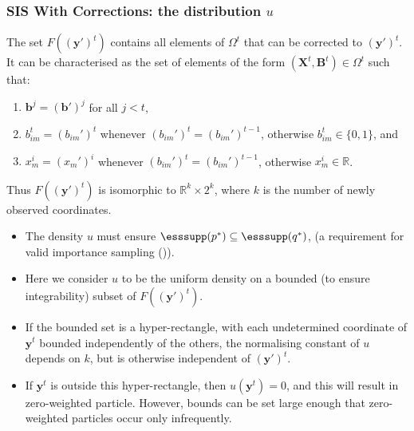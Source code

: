 \documentclass[9pt, xcolor={dvipsnames,svgnames,table}]{beamer}
\newcommand{\Real}{\mathbb R}
\begin{document}
\begin{frame}
    \frametitle{SIS With Corrections: the distribution $u$}
    The set $F(\bm{(y')}^{t})$ contains all elements of $\Omega^t$ that can be corrected to $\bm{(y')}^{t}$. It can be characterised as the set of elements of the form $(\bm{X}^{t},\bm{B}^{t}) \in \Omega^t$ such that:
    \begin{enumerate}
        \item $\bm{b}^{j} = (\bm{b}')^{j}$ for all $j < t$,
        \item $b_{im}^{t} = (b_{im}')^t$ whenever $(b_{im}')^t = (b_{im}')^{t-1}$, otherwise $b_{im}^{t} \in \{ 0, 1 \}$, and
        \item $x_{m}^{i} = (x_{m}')^{i}$ whenever $(b_{im}')^t = (b_{im}')^{t-1}$, otherwise $x_{m}^{i} \in \Real$.
    \end{enumerate}
    Thus $F(\bm{(y')}^{t})$ is isomorphic to $\Real^k \times 2^k$, where $k$ is the number of newly observed coordinates.
    
    \begin{itemize}
        \item The density $u$ must ensure $\esssupp(p^*) \subseteq \esssupp(q^*)$, (a requirement for valid importance sampling (\cite{Geweke})).
        \item Here we consider $u$ to be the uniform density on a bounded (to ensure integrability) subset of $F(\bm{(y')}^{t})$.
        \item If the bounded set is a hyper-rectangle, with each undetermined coordinate of $\bm{y}^{t}$ bounded independently of the others, the normalising constant of $u$ depends on $k$, but is otherwise independent of $\bm{(y')}^{t}$.
        \item If $\bm{y}^t$ is outside this hyper-rectangle, then $u(\bm{y}^t) = 0$, and this will result in zero-weighted particle. However, bounds can be set large enough that zero-weighted particles occur only infrequently.
    \end{itemize}
       
\end{frame}
\end{document}

